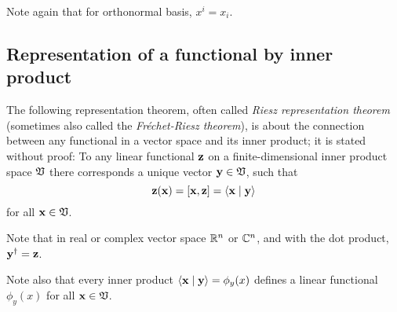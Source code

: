 Note again that for orthonormal basis,
$x^i=x_i$.


\subsection{Representation of a functional by inner product}
\label{2011-m-corr-bil-ip}
The following representation theorem,
often called
{\em Riesz representation theorem}
(sometimes also called the {\em Fr\'echet-Riesz theorem}),
is about the connection between any functional
in a vector space and its inner product; it is stated without proof:
To any linear functional ${\bf z}$
on a finite-dimensional inner product space ${\frak V}$
there corresponds a unique vector   ${\bf y}\in {\frak V}$,
such that
\begin{equation}
{\bf z} ({\bf x}) =[{\bf x}, {\bf z}]= \langle {\bf x}\mid {\bf y}\rangle
\end{equation}
for all ${\bf x}\in {\frak V}$.

Note that in  real or complex vector space ${\Bbb R}^n$ or ${\Bbb C}^n$, and with the dot product,
 ${\bf y}^\dagger = {\bf z}$.

Note also that every inner product
$\langle {\bf x}\mid {\bf y}\rangle = \phi_y(x)$ defines a linear
functional $\phi_y(x)$ for all ${\bf x}\in {\frak V}$.



